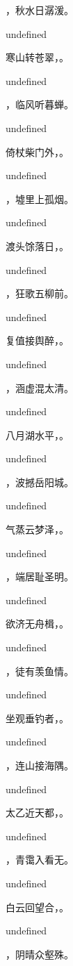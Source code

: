 \documentclass[12pt, a4paper, addpoints]{exam}
\begin{document}
\begin{questions}
\question[3] \fillin，秋水日潺湲。

undefined

\question[3] 寒山转苍翠，\fillin。

undefined

\question[3] \fillin，临风听暮蝉。

undefined

\question[3] 倚杖柴门外，\fillin。

undefined

\question[3] \fillin，墟里上孤烟。

undefined

\question[3] 渡头馀落日，\fillin。

undefined

\question[3] \fillin，狂歌五柳前。

undefined

\question[3] 复值接舆醉，\fillin。

undefined

\question[3] \fillin，涵虚混太清。

undefined

\question[3] 八月湖水平，\fillin。

undefined

\question[3] \fillin，波撼岳阳城。

undefined

\question[3] 气蒸云梦泽，\fillin。

undefined

\question[3] \fillin，端居耻圣明。

undefined

\question[3] 欲济无舟楫，\fillin。

undefined

\question[3] \fillin，徒有羡鱼情。

undefined

\question[3] 坐观垂钓者，\fillin。

undefined

\question[3] \fillin，连山接海隅。

undefined

\question[3] 太乙近天都，\fillin。

undefined

\question[3] \fillin，青霭入看无。

undefined

\question[3] 白云回望合，\fillin。

undefined

\question[3] \fillin，阴晴众壑殊。


\end{questions}
\end{document}
